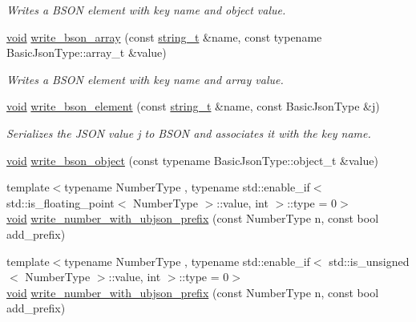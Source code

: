 \begin{DoxyCompactItemize}
\begin{DoxyCompactList}\small\item\em Writes a B\+S\+ON element with key {\itshape name} and object {\itshape value}. \end{DoxyCompactList}\item 
\mbox{\hyperlink{namespacenlohmann_1_1detail_a59fca69799f6b9e366710cb9043aa77d}{void}} \mbox{\hyperlink{classnlohmann_1_1detail_1_1binary__writer_a025212bd170253638b9f05b3b6aa5bf9}{write\+\_\+bson\+\_\+array}} (const \mbox{\hyperlink{classnlohmann_1_1detail_1_1binary__writer_a29f2ae7a5c4a8c1dae47b3b2310de8a8}{string\+\_\+t}} \&name, const typename Basic\+Json\+Type\+::array\+\_\+t \&value)
\begin{DoxyCompactList}\small\item\em Writes a B\+S\+ON element with key {\itshape name} and array {\itshape value}. \end{DoxyCompactList}\item 
\mbox{\hyperlink{namespacenlohmann_1_1detail_a59fca69799f6b9e366710cb9043aa77d}{void}} \mbox{\hyperlink{classnlohmann_1_1detail_1_1binary__writer_a7ff58bf1a80018148bed860667ffca07}{write\+\_\+bson\+\_\+element}} (const \mbox{\hyperlink{classnlohmann_1_1detail_1_1binary__writer_a29f2ae7a5c4a8c1dae47b3b2310de8a8}{string\+\_\+t}} \&name, const Basic\+Json\+Type \&j)
\begin{DoxyCompactList}\small\item\em Serializes the J\+S\+ON value {\itshape j} to B\+S\+ON and associates it with the key {\itshape name}. \end{DoxyCompactList}\item 
\mbox{\hyperlink{namespacenlohmann_1_1detail_a59fca69799f6b9e366710cb9043aa77d}{void}} \mbox{\hyperlink{classnlohmann_1_1detail_1_1binary__writer_a29b3e0f83a8e5f2307804023109ba2c9}{write\+\_\+bson\+\_\+object}} (const typename Basic\+Json\+Type\+::object\+\_\+t \&value)
\item 
{\footnotesize template$<$typename Number\+Type , typename std\+::enable\+\_\+if$<$ std\+::is\+\_\+floating\+\_\+point$<$ Number\+Type $>$\+::value, int $>$\+::type  = 0$>$ }\\\mbox{\hyperlink{namespacenlohmann_1_1detail_a59fca69799f6b9e366710cb9043aa77d}{void}} \mbox{\hyperlink{classnlohmann_1_1detail_1_1binary__writer_a0ea6745f944c0c61672146886b4ee90f}{write\+\_\+number\+\_\+with\+\_\+ubjson\+\_\+prefix}} (const Number\+Type n, const bool add\+\_\+prefix)
\item 
{\footnotesize template$<$typename Number\+Type , typename std\+::enable\+\_\+if$<$ std\+::is\+\_\+unsigned$<$ Number\+Type $>$\+::value, int $>$\+::type  = 0$>$ }\\\mbox{\hyperlink{namespacenlohmann_1_1detail_a59fca69799f6b9e366710cb9043aa77d}{void}} \mbox{\hyperlink{classnlohmann_1_1detail_1_1binary__writer_a0ea6745f944c0c61672146886b4ee90f}{write\+\_\+number\+\_\+with\+\_\+ubjson\+\_\+prefix}} (const Number\+Type n, const bool add\+\_\+prefix)

\end{DoxyCompactItemize}

